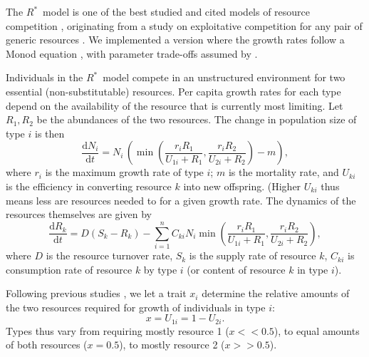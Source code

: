 \documentclass[a4paper,11pt]{article}
\newcommand{\verify}[1]{{\color{navy}{(verify: #1)}}}
\newcommand{\ud}{\ensuremath{\mathrm{d}}}
\newcommand{\Rstar}{\ensuremath{R^*}}
\begin{document}
The \Rstar\ model is one of the best studied and cited models of resource competition \citep{Tilman-1977, Tilman-1982, Huisman-2001}, originating from a study on exploitative competition for any pair of generic resources \citep{Leon-1975}. We implemented a version where the growth rates follow a Monod equation \citep{Huisman-2001}, with parameter trade-offs assumed by \citet{Fox-2008}.

Individuals in the \Rstar\ model compete in an unstructured environment for two essential (non-substitutable) resources. Per capita growth rates for each type depend on the availability of the resource that is currently most limiting. Let $R_1, R_2$ be the abundances of the two resources. The change in population size of type $i$ is then
\begin{equation}
  \label{eq:rstar-n}
  \frac{\ud N_i}{\ud t} = N_i \, \left(\min\left(\frac{r_i R_1}{U_{1i} + R_1}, \frac{r_i R_2}{U_{2i} + R_2}\right) - m\right),
\end{equation}
where $r_i$ is the maximum growth rate of type $i$; $m$ is the mortality rate, and $U_{ki}$ is the efficiency in converting resource $k$ into new offspring. (Higher $U_{ki}$ thus means less are resources needed to for a given growth rate. The dynamics of the resources themselves are given by
\begin{equation}
  \label{eq:rstar-r}
  \frac{\ud R_k}{\ud t} =
  D (S_k - R_k) - \sum_{i=1}^n {C_{ki} N_i
    \min\left(\frac{r_i R_1}{U_{1i} + R_1}, \frac{r_i R_2}{U_{2i} + R_2}\right)},
\end{equation}
where $D$ is the resource turnover rate, $S_k$ is the supply rate of resource $k$, $C_{ki}$ is consumption rate of resource $k$ by type $i$ (or content of resource $k$ in type $i$).

\verify{DANIEL : I think we are missing $r_i$ in the equation of the
  resource, I added it back and move it to functional response
  function as this is the most classical way of writting the equations.}

Following previous studies \citep{Tilman-1985, Schreiber-2003, Fox-2008}, we let a trait $x_i$ determine the relative amounts of the two resources required for growth of individuals in type $i$: \begin{equation}
\label{eq:R3}
x = U_{1i} = 1 - U_{2i}.
\end{equation}
Types thus vary from requiring mostly resource 1 ($x << 0.5$), to equal amounts of both resources ($x = 0.5$), to mostly resource 2 ($x >> 0.5$).
\end{document}
